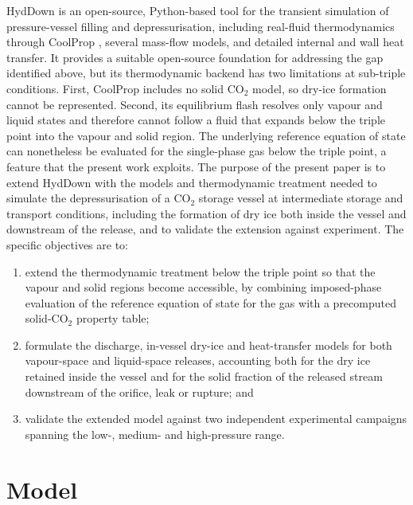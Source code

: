 \documentclass[5p,authoryear]{elsarticle}
\begin{document}
HydDown \citep{Andreasen2021, Andreasen2026} is an open-source, Python-based tool for the
transient simulation of pressure-vessel filling and depressurisation, including real-fluid
thermodynamics through CoolProp \citep{Bell2014}, several mass-flow models, and detailed internal
and wall heat transfer. It provides a suitable open-source foundation for addressing the gap
identified above, but its thermodynamic backend has two limitations at sub-triple conditions.
First, CoolProp includes no solid CO$_2$ model, so dry-ice formation cannot be represented.
Second, its equilibrium flash resolves only vapour and liquid states and therefore cannot follow
a fluid that expands below the triple point into the vapour and solid region. The underlying
reference equation of state \citep{Span1996} can nonetheless be evaluated for the single-phase gas
below the triple point, a feature that the present work exploits. The purpose of the present paper
is to extend HydDown with the models and thermodynamic treatment needed to simulate the
depressurisation of a CO$_2$ storage vessel at intermediate storage and transport conditions,
including the formation of dry ice both inside the vessel and downstream of the release, and to
validate the extension against experiment. The specific objectives are to:
\begin{enumerate}
  \item extend the thermodynamic treatment below the triple point so that the vapour and solid
        regions become accessible, by combining imposed-phase evaluation of the reference equation
        of state for the gas with a precomputed solid-CO$_2$ property table;
  \item formulate the discharge, in-vessel dry-ice and heat-transfer models for both vapour-space
        and liquid-space releases, accounting both for the dry ice retained inside the vessel and
        for the solid fraction of the released stream downstream of the orifice, leak or rupture;
        and
  \item validate the extended model against two independent experimental campaigns spanning the
        low-, medium- and high-pressure range.
\end{enumerate}

\section{Model}
\label{sec:model}
\end{document}
